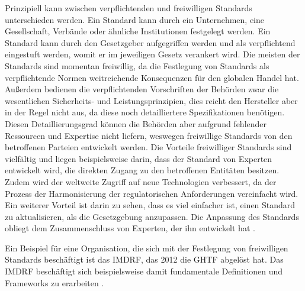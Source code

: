 \documentclass[a4paper,12pt]{report}
\begin{document}
Prinzipiell kann zwischen verpflichtenden und freiwilligen Standards unterschieden werden. Ein Standard kann durch ein Unternehmen, eine Gesellschaft, Verbände oder ähnliche Institutionen festgelegt werden. Ein Standard kann durch den Gesetzgeber aufgegriffen werden und als verpflichtend eingestuft werden, womit er im jeweiligen Gesetz verankert wird. Die meisten der Standards sind momentan freiwillig, da die Festlegung von Standards als verpflichtende Normen weitreichende Konsequenzen für den globalen Handel hat. Außerdem bedienen die verpflichtenden Vorschriften der Behörden zwar die wesentlichen Sicherheits- und Leistungsprinzipien, dies reicht den Hersteller aber in der Regel nicht aus, da diese noch detailliertere Spezifikationen benötigen. Diesen Detaillierungsgrad können die Behörden aber aufgrund fehlender Ressourcen und Expertise nicht liefern, weswegen freiwillige Standards von den betroffenen Parteien entwickelt werden. Die Vorteile freiwilliger Standards sind vielfältig und liegen beispielsweise darin, dass der Standard von Experten entwickelt wird, die direkten Zugang zu den betroffenen Entitäten besitzen. Zudem wird der weltweite Zugriff auf neue Technologien verbessert, da der Prozess der Harmonisierung der regulatorischen Anforderungen vereinfacht wird. Ein weiterer Vorteil ist darin zu sehen, dass es viel einfacher ist, einen Standard zu aktualisieren, als die Gesetzgebung anzupassen. Die Anpassung des Standards obliegt dem Zusammenschluss von Experten, der ihn entwickelt hat \citep[vgl.][S. 19-22]{Cheng2003}.

Ein Beispiel für eine Organisation, die sich mit der Festlegung von freiwilligen Standards beschäftigt ist das \ac{IMDRF}, das 2012 die \ac{GHTF} abgelöst hat. Das \ac{IMDRF} beschäftigt sich beispielsweise damit fundamentale Definitionen und Frameworks zu erarbeiten \citep[vgl.][]{Hall2014}.
\end{document}
